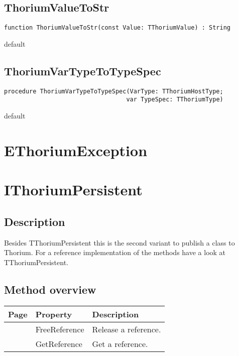 \subsection{ThoriumValueToStr}
\label{thoriumcore:thorium:thoriumvaluetostr}
\begin{FPCList}
\Synopsis
\Declaration 

\begin{verbatim}
function ThoriumValueToStr(const Value: TThoriumValue) : String
\end{verbatim}
\Visibility
default
\Description
\Errors
\end{FPCList}
\subsection{ThoriumVarTypeToTypeSpec}
\label{thoriumcore:thorium:thoriumvartypetotypespec}
\begin{FPCList}
\Synopsis
\Declaration 

\begin{verbatim}
procedure ThoriumVarTypeToTypeSpec(VarType: TThoriumHostType;
                                  var TypeSpec: TThoriumType)
\end{verbatim}
\Visibility
default
\Description
\Errors
\end{FPCList}
\section{EThoriumException}
\label{thoriumcore:thorium:ethoriumexception}
\section{IThoriumPersistent}
\label{thoriumcore:thorium:ithoriumpersistent}
\subsection{Description}
Besides TThoriumPersistent this is the second variant to publish a class to Thorium. For a reference implementation of the methods have a look at  TThoriumPersistent. %
\subsection{Method overview}
\label{thoriumcore:thorium:ithoriumpersistent:methods}
\begin{tabularx}{\textwidth}{llX}
Page & Property & Description  \\ \hline
\pageref{thoriumcore:thorium:ithoriumpersistent:freereference} & FreeReference  & Release a reference. \\
\pageref{thoriumcore:thorium:ithoriumpersistent:getreference} & GetReference  & Get a reference. \\
\hline
\end{tabularx}

